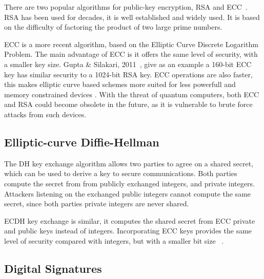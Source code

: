 There are two popular algorithms for public-key encryption, \ac{RSA} and \ac{ECC}~\cite{mahto2016security}.
\ac{RSA} has been used for decades, it is well established and widely used. It is based on the difficulty of factoring the product of two large prime numbers.


\ac{ECC} is a more recent algorithm, based on the Elliptic Curve Discrete Logarithm Problem. The main advantage of \ac{ECC} is it offers the same level of security, with a smaller key size. Gupta \& Silakari, 2011~\cite{eccoverrsa}, give as an example a 160-bit \ac{ECC} key has similar security to a 1024-bit \ac{RSA} key.
\ac{ECC} operations are also faster, this makes elliptic curve based schemes more suited for less powerfull and memory constrained devices \cite{selvakumaraswamy2016efficient}.
With the threat of quantum computers, both \ac{ECC} and \ac{RSA} could become obsolete in the future, as it is vulnerable to brute force attacks from such devices.

\subsection{Elliptic-curve Diffie-Hellman}\label{chap:background:crypto:ecdh}

The \ac{DH} key exchange algorithm allows two parties to agree on a shared secret, which can be used to derive a key to secure communications. Both parties compute the secret from from publicly exchanged integers, and private integers. Attackers listening on the exchanged public integers cannot compute the same secret, since both parties private integers are never shared.

\ac{ECDH} key exchange is similar, it computes the shared secret from \ac{ECC} private and public keys instead of integers. Incorporating \ac{ECC} keys provides the same level of security compared with integers, but with a smaller bit size ~\cite{fiskiran2002workload}.


\subsection{Digital Signatures}\label{chap:background:crypto:signatures}

